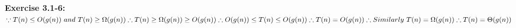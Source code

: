 \documentclass{article}
\begin{document}
\begin{spacing}{2.0}
\noindent
\textbf{Exercise 3.1-6:}\\
$
\because T(n) \le O(g(n))\ and\ T(n) \ge \Omega(g(n))\\
\therefore T(n) \ge \Omega(g(n)) \ge O(g(n))\\
\therefore O(g(n)) \le T(n) \le O(g(n))\\
\therefore T(n) = O(g(n))\\
\therefore Similarly\ T(n) = \Omega(g(n))\\
\therefore T(n) = \Theta(g(n))\\
$
\end{spacing}
\end{document}
